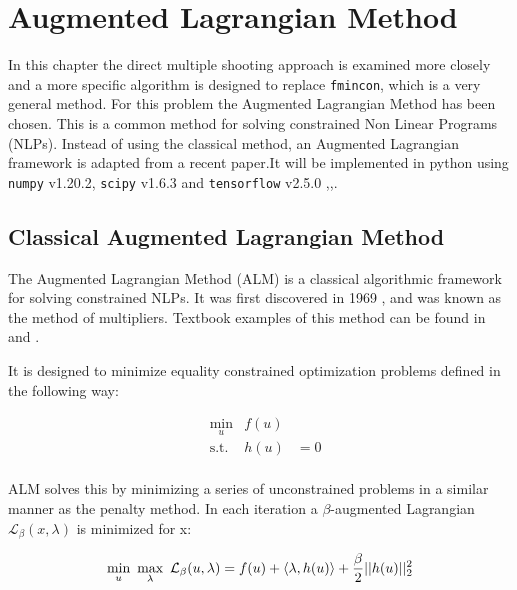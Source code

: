 \chapter{Augmented Lagrangian Method}
\label{cha:2}
In this chapter the direct multiple shooting approach is examined more closely and a more specific algorithm is designed to replace \texttt{fmincon}, which is a very general method. For this problem the Augmented Lagrangian Method has been chosen. This is a common method for solving constrained Non Linear Programs (NLPs). Instead of using the classical method, an Augmented Lagrangian framework is adapted from a recent paper\cite{sahin2019}.It will be implemented in python using \texttt{numpy} v1.20.2, \texttt{scipy} v1.6.3  and \texttt{tensorflow} v2.5.0 \cite{numpy},\cite{scipy},\cite{tensorflow}.

\section{Classical Augmented Lagrangian Method}
The Augmented Lagrangian Method (ALM) is a classical algorithmic framework for solving constrained NLPs. It was first discovered in 1969 \cite{Hestenes1969},\cite{Powell1969} and was known as the method of multipliers. Textbook examples of this method can be found in \cite{Birgin2009} and \cite{bertsekas2014constrained}.

It is designed to minimize equality constrained optimization problems defined in the following way:

\begin{equation}
	\begin{aligned}
	& \underset{u}{\text{min}} & f(u) & \\
	& \text{s.t.} & h(u) &= 0 \\
	\end{aligned}
\end{equation}

ALM solves this by minimizing a series of unconstrained problems in a similar manner as the penalty method. In each iteration a $\beta$-augmented Lagrangian $\mathcal{L}_\beta(x,\lambda)$ is minimized for x:

\begin{equation}
	\underset{u}{\text{min}} \hspace{.5em} \underset{\lambda}{\text{max}} \hspace{.5em}  \mathcal{L}_\beta(u,\lambda) = f(u) + \langle\lambda,h(u)\rangle + \frac{\beta}{2} || h(u) ||^2_2
\end{equation}

